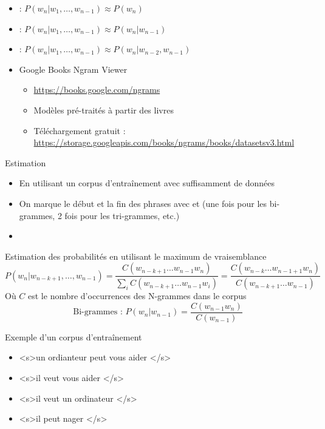 \documentclass{KodeBook}
\begin{document}
\begin{itemize}
	\item {} : $P(w_n | w_1,\ldots, w_{n-1}) \approx P(w_n)$
	\item {} : $P(w_n | w_1,\ldots, w_{n-1}) \approx P(w_n | w_{n-1})$
	\item {} :  $P(w_n | w_1,\ldots, w_{n-1}) \approx P(w_n | w_{n-2}, w_{n-1})$
	\item Google Books Ngram Viewer
	\begin{itemize}
		\item \url{https://books.google.com/ngrams}
		\item Modèles pré-traités à partir des livres 
		\item Téléchargement gratuit : \url{https://storage.googleapis.com/books/ngrams/books/datasetsv3.html}
	\end{itemize}
\end{itemize}

Estimation
\begin{itemize}
	\item En utilisant un corpus d'entraînement avec suffisamment de données
	\item On marque le début et la fin des phrases avec  et  (une fois pour les bi-grammes, 2 fois pour les tri-grammes, etc.)
	\item {}
\end{itemize}

\begin{block}{Estimation des probabilités en utilisant le maximum de vraisemblance}
	{\small \[%
		P(w_n | w_{n-k+1},\ldots, w_{n-1}) = \frac{C(w_{n-k+1} \ldots w_{n-1} w_n)}{\sum_i C(w_{n-k+1} \ldots w_{n-1} w_i)}
		= \frac{C(w_{n-k} \ldots w_{n-1+1} w_n)}{C(w_{n-k+1} \ldots w_{n-1})}
		\]}
	Où $C$ est le nombre d'occurrences des N-grammes dans le corpus
	\[%
	\text{Bi-grammes : } P(w_n | w_{n-1}) = \frac{C(w_{n-1} w_n)}{C(w_{n-1})}
	\]
\end{block}

\begin{exampleblock}{Exemple d'un corpus d'entraînement}
	\begin{itemize}
		\item \textless s\textgreater un ordianteur peut vous aider \textless/s\textgreater
		\item \textless s\textgreater il veut vous aider \textless/s\textgreater
		\item \textless s\textgreater il veut un ordinateur \textless/s\textgreater
		\item \textless s\textgreater il peut nager \textless/s\textgreater
	\end{itemize}
\end{exampleblock}
\end{document}
